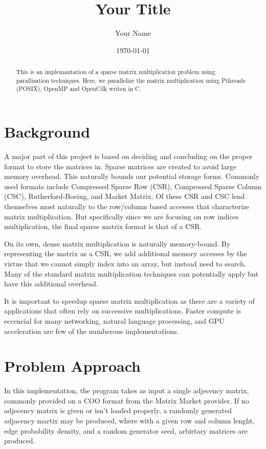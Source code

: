\documentclass[a4paper, 12pt]{article}
\title{Your Title}
\author{Your Name}
\date{\today}
\begin{document}
\begin{titlingpage}
    \maketitle
    \begin{abstract}
	    This is an implemantation of a sparse matrix multiplication problem using parallisation techniques. Here, we parallelize the matrix multiplication using Pthreads (POSIX), OpenMP and OpenCilk writen in C.
    \end{abstract}
\end{titlingpage}

\section{Background}

A major part of this project is based on deciding and concluding on the proper format to store the matrices in. Sparse matrices are created to avoid large memory overhead. This naturally bounds our potential storage forms. Commonly used formats include Compressed Sparse Row (CSR), Compressed Sparse Column (CSC), Rutherford-Boeing, and Market Matrix. Of these CSR and CSC lend themselves most naturally to the row/column based accesses that characterize matrix multiplication. But specifically since we are focusing on row indices multiplication, the final sparse matrix format is that of a CSR.


On its own, dense matrix multiplication is naturally memory-bound. By representing the matrix as a CSR, we add additional memory accesses by the virtue that we cannot simply index into an array, but instead need to search. Many of the standard matrix multiplication techniques can potentially apply but have this additional overhead.

It is important to speedup sparse matrix multiplication as there are a variety of applications that often rely on successive multiplications. Faster compute is eccencial for many networking, natural language processing, and GPU acceleration are few of the numberous implementations.


\section{Problem Approach}

In this implementation, the program takes as input a single adjecency matrix, commonly provided on a COO format from the Matrix Market provider. If no adjecency matrix is given or isn't loaded properly, a randomly generated adjacency martix may be produced, where with a given row and column lenght, edge probability density, and a random generator seed, arbirtary matrices are produced.
\end{document}
